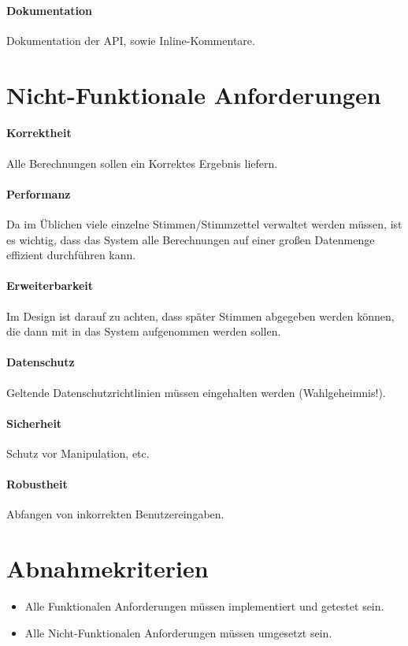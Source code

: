 \documentclass[11pt,a4paper]{scrartcl}
\begin{document}
\paragraph{Dokumentation}
Dokumentation der API, sowie Inline-Kommentare.
\section{Nicht-Funktionale Anforderungen}
\paragraph{Korrektheit}
Alle Berechnungen sollen ein Korrektes Ergebnis liefern.
\paragraph{Performanz}
Da im Üblichen viele einzelne Stimmen/Stimmzettel verwaltet werden müssen, ist es wichtig, dass das System alle Berechnungen auf einer großen Datenmenge effizient durchführen kann.
\paragraph{Erweiterbarkeit}
Im Design ist darauf zu achten, dass später Stimmen abgegeben werden können, die dann mit in das System aufgenommen werden sollen.
\paragraph{Datenschutz}
Geltende Datenschutzrichtlinien müssen eingehalten werden (Wahlgeheimnis!).
\paragraph{Sicherheit}
Schutz vor Manipulation, etc.
\paragraph{Robustheit}
Abfangen von inkorrekten Benutzereingaben.
\section{Abnahmekriterien}
\begin{itemize}
\item Alle Funktionalen Anforderungen müssen implementiert und getestet sein.
\item Alle Nicht-Funktionalen Anforderungen müssen umgesetzt sein.
\end{itemize}
\end{document}

